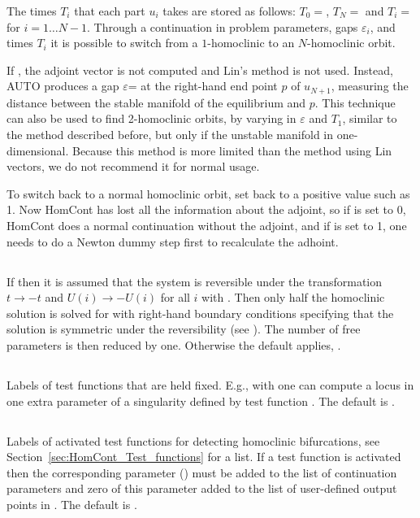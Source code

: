 \documentclass[12pt]{report}
\begin{document}
\begin{itemize}
The times $T_i$ that each part $u_i$ takes are stored as follows: 
$T_0=$, $T_N=$ and $T_i=$
for $i=1\ldots N-1$. Through a continuation in problem parameters,
gaps $\varepsilon_i$, and times $T_i$ 
it is possible to switch from a $1$-homoclinic to
an $N$-homoclinic orbit.

If , the adjoint vector is not computed and Lin's
method is not used. Instead, AUTO produces a gap
$\varepsilon$= at the right-hand end point $p$ of
$u_{N+1}$, measuring the distance between the stable manifold of the
equilibrium and $p$. This technique can also be used to find 2-homoclinic
orbits, by varying in $\varepsilon$ and $T_1$, similar to the method
described before, but only if the unstable manifold in
one-dimensional. Because this method is more limited than the method
using Lin vectors, we do not recommend it for normal usage.

To switch back to a normal homoclinic orbit, set  back to
a positive value such as 1. Now HomCont has lost all the information
about the adjoint, so if  is set to 0, HomCont
does a normal continuation without the adjoint, and
if  is set to 1, one needs to do a Newton dummy step
first to recalculate the adhoint.
\end{itemize}

\subsection{}  \label{sec:IREV}
If  then it is assumed that
the system is reversible under the transformation 
$t \to -t$ and $U(i) \to -U(i)$ for all $i$ with 
. Then only half the homoclinic solution is
solved for with right-hand boundary conditions specifying
that the solution is symmetric under the reversibility
(see ). The number of free parameters
is then reduced by one. Otherwise the default applies, .

\subsection{}  \label{sec:IFIXED}
Labels of test functions that are held fixed. 
E.g., with  one can compute a locus in
one extra parameter of a singularity defined by 
test function . The default is .

\subsection{}  \label{sec:IPSI}
Labels of activated test functions for detecting homoclinic
bifurcations, see Section~\ref{sec:HomCont_Test_functions} 
for a list. If a test function is activated then the
corresponding parameter () 
must be added to the list of continuation parameters 
and zero of this parameter added to the list of user-defined
output points  in .
The default is .
\end{document}
